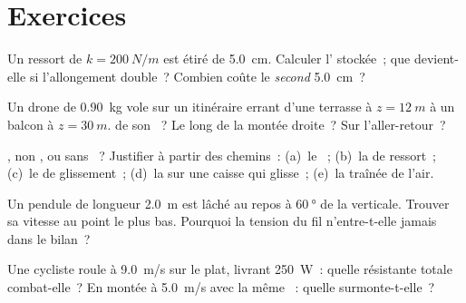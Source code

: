 \section{Exercices}

\begin{exercise}[$\star$]\label{exo:g12:work-and-energy:1}
Un ressort de  $k = \qty{200}{N/m}$ est étiré de
\qty{5.0}{cm}. Calculer l' stockée~; que devient-elle
si l'allongement double~? Combien coûte le \emph{second}
\qty{5.0}{cm}~?
\end{exercise}

\begin{exercise}[$\star$]\label{exo:g12:work-and-energy:2}
Un drone de \qty{0.90}{kg} vole sur un itinéraire errant d'une
terrasse à $z = \qty{12}{m}$ à un balcon à $z = \qty{30}{m}$.
 de son ~? Le long de la
montée droite~? Sur l'aller-retour~?
\end{exercise}

\begin{exercise}[$\star$]\label{exo:g12:work-and-energy:3}
, non
, ou sans ~? Justifier à partir des chemins~:
(a)~le ~; (b)~la  de ressort~;
(c)~le  de glissement~; (d)~la
 sur une caisse qui glisse~; (e)~la traînée
de l'air.
\end{exercise}

\begin{exercise}[$\star$]\label{exo:g12:work-and-energy:4}
Un pendule de longueur \qty{2.0}{m} est lâché au repos à
$\qty{60}{\degree}$ de la verticale. Trouver sa vitesse au point le
plus bas. Pourquoi la tension du fil n'entre-t-elle jamais
dans le bilan~?
\end{exercise}

\begin{exercise}[$\star$]\label{exo:g12:work-and-energy:5}
Une cycliste roule à \qty{9.0}{m/s} sur le plat, livrant
\qty{250}{W}~: quelle  résistante
totale combat-elle~? En montée à \qty{5.0}{m/s} avec la même
~: quelle  surmonte-t-elle~?
\end{exercise}

